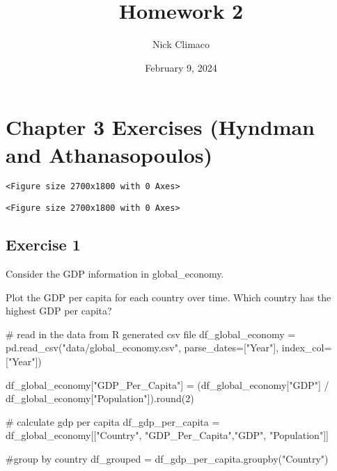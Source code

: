 \documentclass[
  11pt,
]{article}
\title{Homework 2}
\author{Nick Climaco}
\date{February 9, 2024}
\newenvironment{Shaded}{\begin{snugshade}}{\end{snugshade}}
\newcommand{\BuiltInTok}[1]{\textcolor[rgb]{0.00,0.23,0.31}{#1}}
\newcommand{\CommentTok}[1]{\textcolor[rgb]{0.37,0.37,0.37}{#1}}
\newcommand{\DecValTok}[1]{\textcolor[rgb]{0.68,0.00,0.00}{#1}}
\newcommand{\NormalTok}[1]{\textcolor[rgb]{0.00,0.23,0.31}{#1}}
\newcommand{\OperatorTok}[1]{\textcolor[rgb]{0.37,0.37,0.37}{#1}}
\newcommand{\StringTok}[1]{\textcolor[rgb]{0.13,0.47,0.30}{#1}}
\renewcommand*\contentsname{Table of contents}
\newcommand\contentsname{Table of contents}
\begin{document}
\maketitle

\renewcommand*\contentsname{Table of contents}
{
\hypersetup{linkcolor=}
\setcounter{tocdepth}{3}
\tableofcontents
}
\newpage

\section{Chapter 3 Exercises (Hyndman and
Athanasopoulos)}\label{chapter-3-exercises-hyndman-and-athanasopoulos}

\begin{verbatim}
<Figure size 2700x1800 with 0 Axes>
\end{verbatim}

\begin{verbatim}
<Figure size 2700x1800 with 0 Axes>
\end{verbatim}

\subsection{Exercise 1}\label{exercise-1}

Consider the GDP information in global\_economy.

Plot the GDP per capita for each country over time. Which country has
the highest GDP per capita?

\begin{Shaded}
\begin{Highlighting}[]
\CommentTok{\# read in the data from R generated csv file}
\NormalTok{df\_global\_economy }\OperatorTok{=}\NormalTok{ pd.read\_csv(}\StringTok{"data/global\_economy.csv"}\NormalTok{, }
\NormalTok{                                parse\_dates}\OperatorTok{=}\NormalTok{[}\StringTok{"Year"}\NormalTok{], }
\NormalTok{                                index\_col}\OperatorTok{=}\NormalTok{[}\StringTok{"Year"}\NormalTok{])}

\NormalTok{df\_global\_economy[}\StringTok{"GDP\_Per\_Capita"}\NormalTok{] }\OperatorTok{=}\NormalTok{ (df\_global\_economy[}\StringTok{"GDP"}\NormalTok{] }\OperatorTok{/} 
\NormalTok{df\_global\_economy[}\StringTok{"Population"}\NormalTok{]).}\BuiltInTok{round}\NormalTok{(}\DecValTok{2}\NormalTok{)}

\CommentTok{\# calculate gdp per capita}
\NormalTok{df\_gdp\_per\_capita }\OperatorTok{=}\NormalTok{ df\_global\_economy[[}\StringTok{"Country"}\NormalTok{, }\StringTok{"GDP\_Per\_Capita"}\NormalTok{,}\StringTok{"GDP"}\NormalTok{, }\StringTok{"Population"}\NormalTok{]]}

\CommentTok{\#group by country}
\NormalTok{df\_grouped }\OperatorTok{=}\NormalTok{ df\_gdp\_per\_capita.groupby(}\StringTok{"Country"}\NormalTok{)}
\end{Highlighting}
\end{Shaded}
\end{document}
